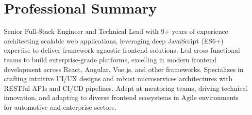\vspace{-0.6em}
\section{Professional Summary}
\noindent \normalsize Senior Full-Stack Engineer and Technical Lead with 9+ years of experience architecting scalable web applications, leveraging deep JavaScript (ES6+) expertise to deliver framework-agnostic frontend solutions. Led cross-functional teams to build enterprise-grade platforms, excelling in modern frontend development across React, Angular, Vue.js, and other frameworks. Specializes in crafting intuitive UI/UX designs and robust microservices architectures with RESTful APIs and CI/CD pipelines. Adept at mentoring teams, driving technical innovation, and adapting to diverse frontend ecosystems in Agile environments for automotive and enterprise sectors.
\nopagebreak[4]